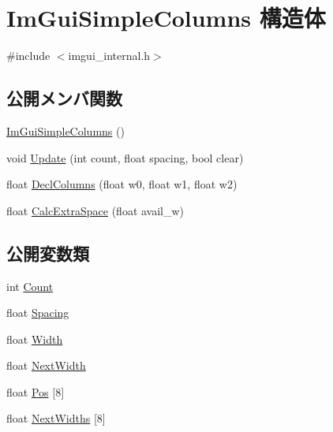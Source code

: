 \hypertarget{struct_im_gui_simple_columns}{}\section{Im\+Gui\+Simple\+Columns 構造体}
\label{struct_im_gui_simple_columns}


{\ttfamily \#include $<$imgui\+\_\+internal.\+h$>$}

\subsection*{公開メンバ関数}
\begin{DoxyCompactItemize}
\item 
\mbox{\hyperlink{struct_im_gui_simple_columns_ac299fa0dc0a471dc8ee3a9f97a67e444}{Im\+Gui\+Simple\+Columns}} ()
\item 
void \mbox{\hyperlink{struct_im_gui_simple_columns_a189662e328df2bf6947d9ab292f8ed21}{Update}} (int count, float spacing, bool clear)
\item 
float \mbox{\hyperlink{struct_im_gui_simple_columns_a2daac4e4973ea1e9f2dda655206796fc}{Decl\+Columns}} (float w0, float w1, float w2)
\item 
float \mbox{\hyperlink{struct_im_gui_simple_columns_aeebfea369d5f37b99f02ecd9ab2187ee}{Calc\+Extra\+Space}} (float avail\+\_\+w)
\end{DoxyCompactItemize}
\subsection*{公開変数類}
\begin{DoxyCompactItemize}
\item 
int \mbox{\hyperlink{struct_im_gui_simple_columns_ac5fdbd35f74c31992c95fc4b759e9c2f}{Count}}
\item 
float \mbox{\hyperlink{struct_im_gui_simple_columns_aee2a43067de182ca1aa1447c8b658935}{Spacing}}
\item 
float \mbox{\hyperlink{struct_im_gui_simple_columns_a3b7ed6f3aa04e3ead1ea17e4d9f92767}{Width}}
\item 
float \mbox{\hyperlink{struct_im_gui_simple_columns_afa5623a5d27aadeb8c08d925b189397e}{Next\+Width}}
\item 
float \mbox{\hyperlink{struct_im_gui_simple_columns_a3c13060fe3e4732512a663bb369f51d8}{Pos}} \mbox{[}8\mbox{]}
\item 
float \mbox{\hyperlink{struct_im_gui_simple_columns_a5d2739196dc2df8626e32a0e373cdffe}{Next\+Widths}} \mbox{[}8\mbox{]}
\end{DoxyCompactItemize}


